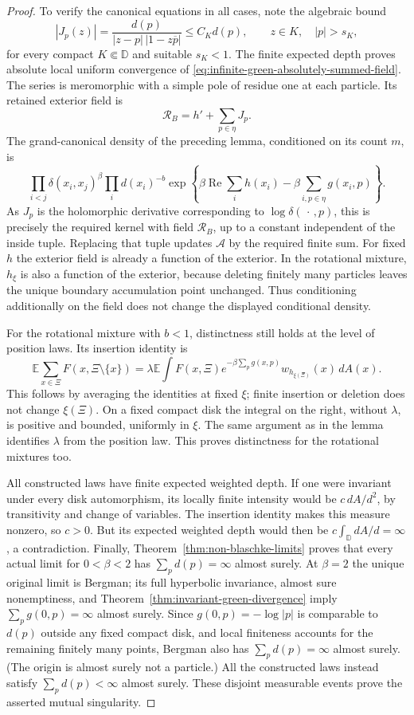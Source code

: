 \documentclass[11pt,a4paper]{article}
\numberwithin{equation}{section}
\theoremstyle{definition}
\theoremstyle{remark}
\newcommand{\D}{\mathbb D}
\begin{document}
\begin{proof}
To verify the canonical equations in all cases, note the algebraic bound
\[
 |J_p(z)|
 =\frac{d(p)}{|z-p|\,|1-z\overline p|}
 \le C_Kd(p),\qquad z\in K,\quad |p|>s_K,
\]
for every compact $K\Subset\D$ and suitable $s_K<1$.
The finite expected depth proves absolute local uniform convergence of
\eqref{eq:infinite-green-absolutely-summed-field}.  The series is
meromorphic with a simple pole of residue one at each particle.  Its
retained exterior field is
\[
 \mathcal R_B=h'+\sum_{p\in\eta}J_p.
\]
The grand-canonical density of the preceding lemma, conditioned on its
count $m$, is
\[
 \prod_{i<j}\delta(x_i,x_j)^\beta
 \prod_i d(x_i)^{-b}
 \exp\left\{\beta\operatorname{Re}\sum_i h(x_i)
                   -\beta\sum_{i,p\in\eta}g(x_i,p)\right\}.
\]
As $J_p$ is the holomorphic derivative corresponding to
$\log\delta(\,\cdot\,,p)$, this is precisely the required kernel with
field $\mathcal R_B$, up to a constant independent of the inside tuple.
Replacing that tuple updates $\mathcal A$ by the required finite sum.
For fixed $h$ the exterior field is already a function of the exterior.
In the rotational mixture, $h_\xi$ is also a function of the exterior,
because deleting finitely many particles leaves the unique boundary
accumulation point unchanged.  Thus conditioning additionally on the
field does not change the displayed conditional density.

For the rotational mixture with $b<1$, distinctness still holds at the
level of position laws.  Its insertion identity is
\[
 \mathbb E\sum_{x\in\Xi}F(x,\Xi\setminus\{x\})
 =\lambda\mathbb E\int F(x,\Xi)e^{-\beta\sum_pg(x,p)}
                     w_{h_{\xi(\Xi)}}(x)\,dA(x).
\]
This follows by averaging the identities at fixed $\xi$; finite insertion
or deletion does not change $\xi(\Xi)$.  On a fixed compact disk the
integral on the right, without $\lambda$, is positive and bounded,
uniformly in $\xi$.  The same argument as in the lemma identifies
$\lambda$ from the position law.  This proves distinctness for the
rotational mixtures too.

All constructed laws have finite expected weighted depth.  If one were
invariant under every disk automorphism, its locally finite intensity
would be $c\,dA/d^2$, by transitivity and change of variables.  The
insertion identity makes this measure nonzero, so $c>0$.  But its
expected weighted depth would then be
$c\int_\D dA/d=\infty$, a contradiction.  Finally, Theorem~\ref{thm:non-blaschke-limits} proves that every actual
limit for $0<\beta<2$ has $\sum_pd(p)=\infty$ almost surely.  At
$\beta=2$ the unique original limit is Bergman; its full hyperbolic
invariance, almost sure nonemptiness, and
Theorem~\ref{thm:invariant-green-divergence} imply
$\sum_pg(0,p)=\infty$ almost surely.  Since $g(0,p)=-\log|p|$
is comparable to $d(p)$ outside any fixed compact disk, and local
finiteness accounts for the remaining finitely many points, Bergman
also has $\sum_pd(p)=\infty$ almost surely.  (The origin is almost
surely not a particle.)  All the constructed laws instead satisfy
$\sum_pd(p)<\infty$ almost surely.  These disjoint measurable events
prove the asserted mutual singularity.
\end{proof}
\end{document}
